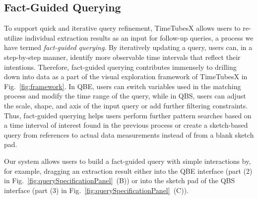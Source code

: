 \subsection{Fact-Guided Querying}\label{sec:factDrivenQuerying}
To support quick and iterative query refinement, TimeTubesX allows users to re-utilize individual extraction results as an input for follow-up queries, a process we have termed \emph{fact-guided querying}.
By iteratively updating a query, users can, in a step-by-step manner, identify more observable time intervals that reflect their intentions.
Therefore, fact-guided querying contributes immensely to drilling down into data as a part of the visual exploration framework of TimeTubesX in Fig.~\ref{fig:framework}.
In QBE, users can switch variables used in the matching process and modify the time range of the query, while in QBS, users can adjust the scale, shape, and axis of the input query or add further filtering constraints.
Thus, fact-guided querying helps users perform further pattern searches based on a time interval of interest found in the previous process or create a sketch-based query from references to actual data measurements instead of from a blank sketch pad.

Our system allows users to build a fact-guided query with simple interactions by, for example, dragging an extraction result either into the QBE interface (part (2) in Fig.~\ref{fig:querySpecificationPanel}~(B)) or into the sketch pad of the QBS interface (part (3) in Fig.~\ref{fig:querySpecificationPanel}~(C)).
%


